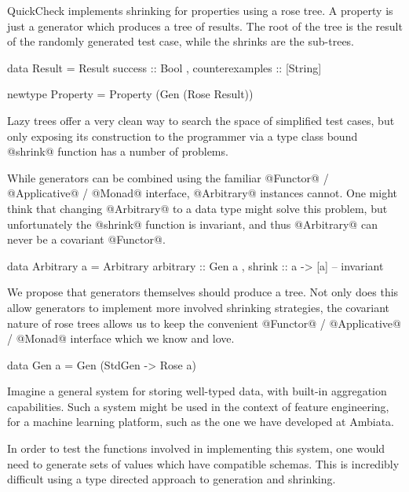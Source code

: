 QuickCheck implements shrinking for properties using a rose tree. A property is just a generator which produces a tree of results. The root of the tree is the result of the randomly generated test case, while the shrinks are the sub-trees.

\begin{code}
  data Result =
    Result {
        success         :: Bool
      , counterexamples :: [String]
      }

  newtype Property =
    Property (Gen (Rose Result))
\end{code}

Lazy trees offer a very clean way to search the space of simplified test cases, but only exposing its construction to the programmer via a type class bound @shrink@ function has a number of problems.

While generators can be combined using the familiar @Functor@ / @Applicative@ / @Monad@ interface, @Arbitrary@ instances cannot. One might think that changing @Arbitrary@ to a data type might solve this problem, but unfortunately the @shrink@ function is invariant, and thus @Arbitrary@ can never be a covariant @Functor@.

\begin{code}
  data Arbitrary a =
    Arbitrary {
        arbitrary :: Gen a
      , shrink    :: a -> [a] -- invariant
      }
\end{code}

We propose that generators themselves should produce a tree. Not only does this allow generators to implement more involved shrinking strategies, the covariant nature of rose trees allows us to keep the convenient @Functor@ / @Applicative@ / @Monad@ interface which we know and love.


\begin{code}
  data Gen a =
    Gen (StdGen -> Rose a)
\end{code}

Imagine a general system for storing well-typed data, with built-in aggregation capabilities. Such a system might be used in the context of feature engineering, for a machine learning platform, such as the one we have developed at Ambiata.

In order to test the functions involved in implementing this system, one would need to generate sets of values which have compatible schemas. This is incredibly difficult using a type directed approach to generation and shrinking.

